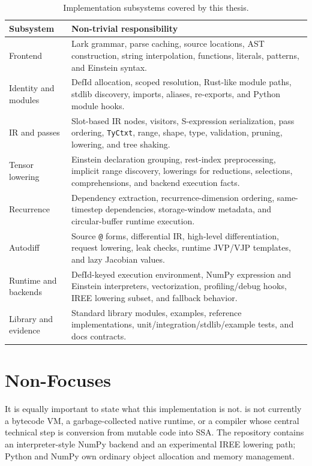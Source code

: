\begin{table}[htbp]
\centering
\caption{Implementation subsystems covered by this thesis.}
\label{tab:implementation-map}
\renewcommand{\arraystretch}{1.08}
\begin{tabular}{@{}L{0.32\textwidth}L{0.56\textwidth}@{}}
\toprule
Subsystem & Non-trivial responsibility \\
\midrule
Frontend & Lark grammar, parse caching, source locations, AST construction, string interpolation, functions, literals, patterns, and Einstein syntax. \\
Identity and modules & DefId allocation, scoped resolution, Rust-like module paths, stdlib discovery, imports, aliases, re-exports, and Python module hooks. \\
IR and passes & Slot-based IR nodes, visitors, S-expression serialization, pass ordering, \texttt{TyCtxt}, range, shape, type, validation, pruning, lowering, and tree shaking. \\
Tensor lowering & Einstein declaration grouping, rest-index preprocessing, implicit range discovery, lowerings for reductions, selections, comprehensions, and backend execution facts. \\
Recurrence & Dependency extraction, recurrence-dimension ordering, same-timestep dependencies, storage-window metadata, and circular-buffer runtime execution. \\
Autodiff & Source \texttt{@} forms, differential IR, high-level differentiation, request lowering, leak checks, runtime JVP/VJP templates, and lazy Jacobian values. \\
Runtime and backends & DefId-keyed execution environment, NumPy expression and Einstein interpreters, vectorization, profiling/debug hooks, IREE lowering subset, and fallback behavior. \\
Library and evidence & Standard library modules, examples, reference implementations, unit/integration/stdlib/example tests, and docs contracts. \\
\bottomrule
\end{tabular}
\end{table}

\section{Non-Focuses}

It is equally important to state what this implementation is not. \einlang{} is
not currently a bytecode VM, a garbage-collected native runtime, or a compiler
whose central technical step is conversion from mutable code into SSA. The
repository contains an interpreter-style NumPy backend and an experimental IREE
lowering path; Python and NumPy own ordinary object allocation and memory
management.

